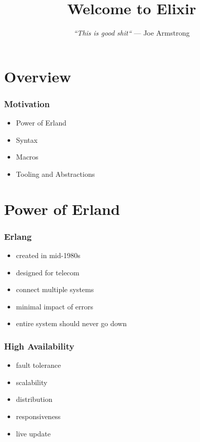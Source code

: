 \documentclass{beamer}
\begin{document}
\title{Welcome to Elixir}
\subtitle{
  \textit{
    \linebreak
    ``This is good shit``
    \linebreak
  }
  \tiny{\textrm{--- Joe Armstrong}}
}
\frame{\titlepage}


\section[Section]{Overview}

\begin{frame}
  \frametitle{Motivation}
  \begin{itemize}
  \item Power of Erland
  \item Syntax
  \item Macros
  \item Tooling and Abstractions
  \end{itemize}
\end{frame}

\section[Section]{Power of Erland}

\begin{frame}
  \frametitle{Erlang}
  \begin{itemize}
  \item created in mid-1980s
  \item designed for telecom
  \item connect multiple systems
  \item minimal impact of errors
  \item entire system should never go down
  \end{itemize}
\end{frame}

\begin{frame}
  \frametitle{High Availability}
  \begin{itemize}
  \item fault tolerance
  \item scalability
  \item distribution
  \item responsiveness
  \item live update
  \end{itemize}
\end{frame}
\end{document}
